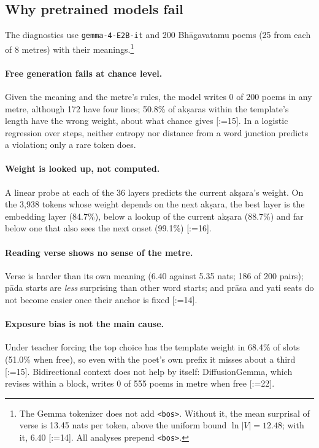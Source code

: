 \documentclass[11pt]{article}
\makeatletter
\DeclareRobustCommand{\exref}[1]{{\scriptsize[\def\ex@sep{}\@for\ex@i:=#1\do{\ex@sep
  \expandafter\ex@item\expandafter{\ex@i}\def\ex@sep{, }}]}}
\newcommand{\ex@item}[1]{\in@{-}{#1}\ifin@\ex@range#1\@nil\else\ex@link{#1}\fi}
\def\ex@range#1-#2\@nil{\ex@link{#1}--\ex@link{#2}}
\newcommand{\ex@link}[1]{\hyperref[exp:E#1]{E#1}}
\makeatother
\begin{document}
\subsection{Why pretrained models fail}\label{sec:why}

The diagnostics use \texttt{gemma-4-E2B-it} and 200 Bhāgavatamu poems (25 from each of 8 metres) with their
meanings.\footnote{The Gemma tokenizer does not add \texttt{<bos>}. Without it, the mean surprisal of verse
is 13.45 nats per token, above the uniform bound $\ln|V| = 12.48$; with it, 6.40 \exref{14}. All analyses prepend
\texttt{<bos>}.}

\paragraph{Free generation fails at chance level.} Given the meaning and the metre's rules, the model writes
0 of 200 poems in any metre, although 172 have four lines; 50.8\% of akṣaras within the template's length
have the wrong weight, about what chance gives \exref{15}. In a logistic regression over steps, neither entropy nor
distance from a word junction predicts a violation; only a rare token does.

\paragraph{Weight is looked up, not computed.} A linear probe at each of the 36 layers predicts the current
akṣara's weight. On the 3,938 tokens whose weight depends on the next akṣara, the best layer is the
embedding layer (84.7\%), below a lookup of the current akṣara (88.7\%) and far below one that also sees the
next onset (99.1\%) \exref{16}.

\paragraph{Reading verse shows no sense of the metre.} Verse is harder than its own meaning (6.40 against
5.35 nats; 186 of 200 pairs); pāda starts are \emph{less} surprising than other word starts; and prāsa and
yati seats do not become easier once their anchor is fixed \exref{14}.

\paragraph{Exposure bias is not the main cause.} Under teacher forcing the top choice has the template weight
in 68.4\% of slots (51.0\% when free), so even with the poet's own prefix it misses about a third \exref{15}.
Bidirectional context does not help by itself: DiffusionGemma, which revises within a block, writes 0 of 555
poems in metre when free \exref{22}.
\end{document}
